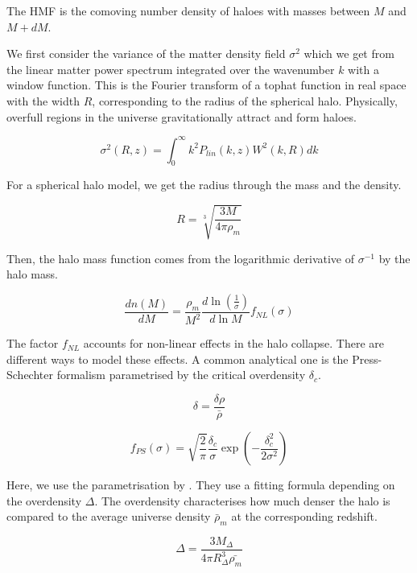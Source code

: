 The HMF is the comoving number density of haloes with masses between $M$ and $M+dM$. 

We first consider the variance of the matter density field $\sigma^2$ which we get from the linear matter power spectrum integrated over the wavenumber $k$ with a window function. This is the Fourier transform of a tophat function in real space with the width $R$, corresponding to the radius of the spherical halo. Physically, overfull regions in the universe gravitationally attract and form haloes.

\begin{equation}
    \sigma^2(R, z) = \int_0^\infty k^2 P_{lin}(k, z) W^2(k, R) dk
\end{equation}

For a spherical halo model, we get the radius through the mass and the density.

\begin{equation}
    R= \sqrt[3]{\frac{3M}{4\pi \rho_m}}
\end{equation}

Then, the halo mass function comes from the logarithmic derivative of $\sigma^{-1}$ by the halo mass.

\begin{equation}
    \frac{dn(M)}{dM }=\frac{\rho_m}{M^2}\frac{d\ln (\frac{1}{\sigma})}{d\ln M}f_{NL}(\sigma)
\end{equation}

The factor $f_{NL}$ accounts for non-linear effects in the halo collapse. There are different ways to model these effects. A common analytical one is the Press-Schechter formalism parametrised by the critical overdensity $\delta_c$.

\begin{equation}
    \delta = \frac{\delta \rho}{\bar{\rho}}
\end{equation}

\begin{equation}
    f_{PS}(\sigma)=\sqrt{\frac{2}{\pi}} \frac{\delta_c}{\sigma}\exp(-\frac{\delta_c^2}{2\sigma^2})
\end{equation}

Here, we use the parametrisation by \cite{tinker_toward_2008}. They use a fitting formula depending on the overdensity $\Delta$. The overdensity characterises how much denser the halo is compared to the average universe density $\bar{\rho}_m$ at the corresponding redshift.

\begin{equation}
    \Delta = \frac{3M_{\Delta}}{4\pi R^3_{\Delta}\bar{\rho_m}}
\end{equation}


